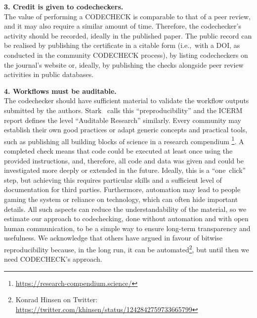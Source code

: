 \documentclass[12pt]{article}
\begin{document}
\textbf{3. Credit is given to codecheckers.} \\
The value of performing a CODECHECK is comparable to that of a peer
review, and it may also require a similar amount of time. Therefore,
the codechecker's activity should be recorded, ideally in the
published paper.  The public record can be realised by publishing the
certificate in a citable form (i.e.,~with a DOI, as conducted in the
community CODECHECK process), by listing codecheckers on the journal's
website or, ideally, by publishing the checks alongside peer review
activities in public databases.

\textbf{4. Workflows must be auditable.} \\
The codechecker should have sufficient material to validate the
workflow outputs submitted by the
authors. Stark~\cite{stark_before_2018} calls this
``preproducibility'' and the ICERM report \cite{stodden_setting_2013}
defines the level ``Auditable Research'' similarly.  Every community
may establish their own good practices or adapt generic concepts and
practical tools, such as publishing all building blocks of science in
a research compendium
\footnote{\url{https://research-compendium.science/}}.  A completed
check means that code could be executed at least once using the
provided instructions, and, therefore, all code and data was given and
could be investigated more deeply or extended in the future.  Ideally,
this is a ``one~click'' step, but achieving this requires particular
skills and a sufficient level of documentation for third
parties. Furthermore, automation may lead to people gaming the system
or reliance on technology, which can often hide important details.
All such aspects can reduce the understandability of the material, so
we estimate our approach to codechecking, done without automation and
with open human communication, to be a simple way to ensure long-term
transparency and usefulness.  We acknowledge that others have argued
in favour of bitwise reproducibility because, in the long run, it can
be automated\footnote{Konrad Hinsen on Twitter:
  \url{https://twitter.com/khinsen/status/1242842759733665799}}, but
until then we need CODECHECK's approach.
\end{document}
